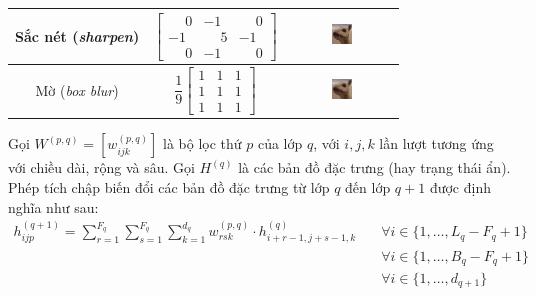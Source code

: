 \begin{table}[htb!]
\begin{tabular}{ c c c }
        Sắc nét (\textit{sharpen})   & $\begin{bmatrix*}\phantom{-}0&-1&\phantom{-}0\\-1&\phantom{-}5&-1\\\phantom{-}0&-1&\phantom{-}0\end{bmatrix*}$    & \includegraphics[width=0.2\textwidth, valign=c]{image/cnn-sharp.png} \\\midrule
        Mờ (\textit{box blur})       & $\dfrac{1}{9}\begin{bmatrix}1&1&1\\1&1&1\\1&1&1\end{bmatrix}$                                                     & \includegraphics[width=0.2\textwidth, valign=c]{image/cnn-blur.png}  \\
        \bottomrule
    \end{tabular}
\end{table}

Gọi $W^{(p,q)}=[w_{ijk}^{(p,q)}]$ là bộ lọc thứ $p$ của lớp $q$, với $i,j,k$ lần lượt tương ứng với chiều dài, rộng và sâu. Gọi $H^{(q)}$ là các bản đồ đặc trưng (hay trạng thái ẩn). Phép tích chập biến đổi các bản đồ đặc trưng từ lớp $q$ đến lớp $q+1$ được định nghĩa như sau: \cite{Aggarwal2023}
\begin{align}
    h_{ijp}^{(q+1)}=\sum_{r=1}^{F_q}\sum_{s=1}^{F_q}\sum_{k=1}^{d_q} w_{rsk}^{(p,q)}\cdot h_{i+r-1,j+s-1,k}^{(q)} & \quad\forall i\in\{1,\dots,L_q-F_q+1\}           \\
                                                                                                                  & \quad\forall i\in\{1,\dots,B_q-F_q+1\} \nonumber \\
                                                                                                                  & \quad\forall i\in\{1,\dots,d_{q+1}\}   \nonumber
\end{align}

